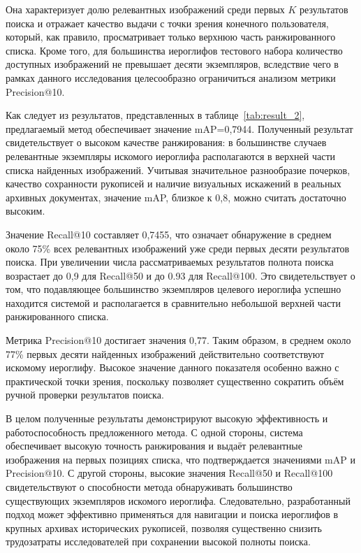 Она характеризует долю релевантных изображений среди первых $K$ результатов поиска и отражает качество выдачи с точки зрения конечного пользователя, который, как правило, просматривает только верхнюю часть ранжированного списка. Кроме того, для большинства иероглифов тестового набора количество доступных изображений не превышает десяти экземпляров, вследствие чего в рамках данного исследования целесообразно ограничиться анализом метрики Precision@10.

Как следует из результатов, представленных в таблице~\cref{tab:result_2}, предлагаемый метод обеспечивает значение mAP=0,7944. Полученный результат свидетельствует о высоком качестве ранжирования: в большинстве случаев релевантные экземпляры искомого иероглифа располагаются в верхней части списка найденных изображений. Учитывая значительное разнообразие почерков, качество сохранности рукописей и наличие визуальных искажений в реальных архивных документах, значение mAP, близкое к 0,8, можно считать достаточно высоким.

Значение Recall@10 составляет 0,7455, что означает обнаружение в среднем около 75\% всех релевантных изображений уже среди первых десяти результатов поиска. При увеличении числа рассматриваемых результатов полнота поиска возрастает до 0,9 для Recall@50 и до 0.93 для Recall@100. Это свидетельствует о том, что подавляющее большинство экземпляров целевого иероглифа успешно находится системой и располагается в сравнительно небольшой верхней части ранжированного списка.

Метрика Precision@10 достигает значения 0,77. Таким образом, в среднем около 77\% первых десяти найденных изображений действительно соответствуют искомому иероглифу. Высокое значение данного показателя особенно важно с практической точки зрения, поскольку позволяет существенно сократить объём ручной проверки результатов поиска.

В целом полученные результаты демонстрируют высокую эффективность и работоспособность предложенного метода. С одной стороны, система обеспечивает высокую точность ранжирования и выдаёт релевантные изображения на первых позициях списка, что подтверждается значениями mAP и Precision@10. С другой стороны, высокие значения Recall@50 и Recall@100 свидетельствуют о способности метода обнаруживать большинство существующих экземпляров искомого иероглифа. Следовательно, разработанный подход может эффективно применяться для навигации и поиска иероглифов в крупных архивах исторических рукописей, позволяя существенно снизить трудозатраты исследователей при сохранении высокой полноты поиска.

